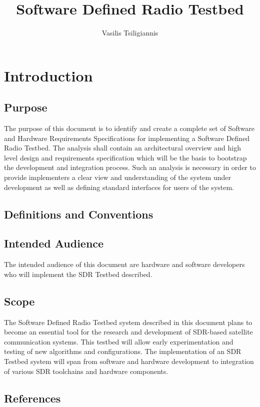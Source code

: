 \documentclass[english,titlepage,a4paper]{report}
\title{Software Defined Radio Testbed}
\author{Vasilis Tsiligiannis}
\begin{document}
\maketitle
\tableofcontents


\chapter{Introduction}
\section{Purpose}

The purpose of this document is to identify and create a complete set of Software and Hardware Requirements Specifications for implementing a Software Defined Radio Testbed.
The analysis shall contain an architectural overview and high level design and requirements specification which will be the basis to bootstrap the development and integration process.
Such an analysis is necessary in order to provide implementers a clear view and understanding of the system under development as well as defining standard interfaces for users of the system.

\section{Definitions and Conventions}

\section{Intended Audience}

The intended audience of this document are hardware and software developers who will implement the SDR Testbed described.

\section{Scope}

The Software Defined Radio Testbed system described in this document plans to become an essential tool for the research and development of SDR-based satellite communication systems.
This testbed will allow early experimentation and testing of new algorithms and configurations.
The implementation of an SDR Testbed system will span from software and hardware development to integration of various SDR toolchains and hardware components.

\section{References}
\end{document}

